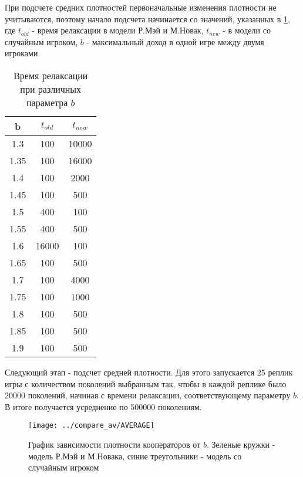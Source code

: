 \documentclass[12pt,a4paper]{article}
\begin{document}
	\par При подсчете средних плотностей первоначальные изменения плотности не учитываются, поэтому начало подсчета начинается со значений, указанных в \ref{tab1}, где $t_{old}$ - время релаксации в модели Р.Мэй и М.Новак,  $t_{new}$ - в модели со случайным игроком,
	$b$ - максимальный доход в одной игре между двумя игроками.
	
	
	\vspace{10px}
	\begin{center}
	\begin{table}[H]
	\centering
		\begin{tabular}[H]{|c|c|c|}
			\hline 
			b&$t_{old}$& $t_{new} $ \\
			\hline 
			1.3& 100 & 10000 \\ 
			\hline 
			1.35& 100 & 16000 \\ 
			\hline 
			1.4& 100 & 2000 \\ 
			\hline 
			1.45& 100 & 500 \\ 
			\hline 
			1.5& 400 & 100 \\ 
			\hline 
			1.55& 400 & 500 \\ 
			\hline 
			1.6& 16000 & 100 \\ 
			\hline 
			1.65& 100 & 500 \\ 
			\hline 
			1.7& 100 & 4000 \\ 
			\hline 
			1.75& 100 & 1000 \\ 
			\hline 
			1.8& 100 & 500 \\ 
			\hline 
			1.85& 100 & 500 \\ 
			\hline 
			1.9& 100 & 500 \\ 
			\hline 
		\end{tabular}
		\label{tab1}
		\caption{Время релаксации при различных параметра $b$}
	\end{table}
	\end{center}	

	\par Следующий этап - подсчет средней плотности. Для этого запускается 25 реплик игры с количеством поколений выбранным так, чтобы в каждой реплике было 20000 поколений, начиная с времени релаксации, соответствующему параметру $b$. В итоге получается усреднение по 500000 поколениям. 
	
	\begin{figure}
			\centering
			\texttt{[image: ../compare\_av/AVERAGE]}
			\caption{График зависимости плотности кооператоров от $b$. Зеленые кружки - модель Р.Мэй и М.Новака, синие треугольники - модель со случайным игроком}
			\label{fig:average}
	\end{figure}
	
\end{document}
